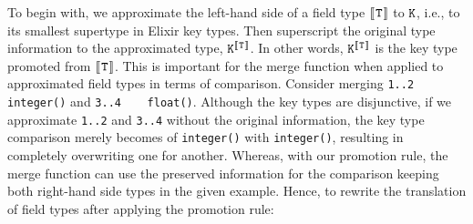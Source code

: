 To begin with, we approximate the left-hand side of a field type $[\![\hspace{.07em}\texttt{T}\hspace{.07em}]\!]$ to $\texttt{K}$, i.e., to its smallest supertype in Elixir key types.
Then superscript the original type information to the approximated type, $\texttt{K}^{[\![\hspace{.07em}\texttt{T}\hspace{.07em}]\!]}$.
In other words, $\texttt{K}^{[\![\hspace{.07em}\texttt{T}\hspace{.07em}]\!]}$ is the key type promoted from $[\![\hspace{.07em}\texttt{T}\hspace{.07em}]\!]$. 
This is important for the merge function when applied to approximated field types in terms of comparison.
Consider merging \texttt{1..2\,\,\fto\,\,integer()} and \texttt{3..4\,\,\fto\,\,float()}. 
Although the key types are disjunctive, if we approximate \texttt{1..2} and \texttt{3..4} without the original information, the key type comparison merely becomes of \texttt{integer()} with \texttt{integer()}, resulting in completely overwriting one for another.
Whereas, with our promotion rule, the merge function can use the preserved information for the comparison keeping both right-hand side types in the given example.
Hence, to rewrite the translation of field types after applying the promotion rule:

